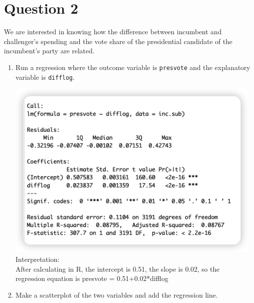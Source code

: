 \documentclass[12pt,letterpaper]{article}
\begin{document}
\newpage

\section*{Question 2}
\noindent We are interested in knowing how the difference between incumbent and challenger's spending and the vote share of the presidential candidate of the incumbent's party are related.	\vspace{.25cm}
	\begin{enumerate}
		\item Run a regression where the outcome variable is \texttt{presvote} and the explanatory variable is \texttt{difflog}.	\vspace{1cm}
		
		\vspace{1cm}
		\includegraphics[width=0.99\textwidth]{2-1.png}
		\vspace{1cm}
		\noindent
		Interpretation:\\
		After calculating in R, the intercept is 0.51, the slope is 0.02, so the regression equation is presvote = 0.51+0.02*difflog
		\item Make a scatterplot of the two variables and add the regression line. 	\vspace{1cm}
		
		\vspace{1cm}

\end{enumerate}
\end{document}
